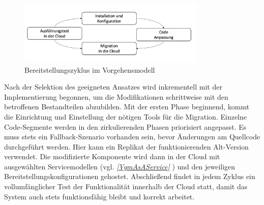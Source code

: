 
\begin{figure}[h] 
  \centering
  \includegraphics[width=0.8\textwidth]{Chapters/Vorgehensmodell/images/Bereitstellungszyklus.png}
  \caption{Bereitstellungszyklus im Vorgehensmodell \cite{ccRoadmap}}
  \label{fig:Bereitstellungszyklus}
\end{figure}
Nach der Selektion des geeigneten Ansatzes wird inkrementell mit der Implementierung begonnen, um die Modifikationen schrittweise mit den betroffenen Bestandteilen abzubilden. Mit der ersten Phase beginnend, kommt die Einrichtung und Einstellung der nötigen Tools für die Migration.  Einzelne Code-Segmente werden in den zirkulierenden Phasen priorisiert angepasst.
Es muss stets ein Fallback-Szenario vorhanden sein, bevor Änderungen am Quellcode durchgeführt werden. Hier kann ein Replikat der funktionierenden Alt-Version verwendet. 
Die modifizierte Komponente wird dann in der Cloud mit ausgewählten Servicemodellen (vgl. \textit{\ref{VgmAsAService} }) und den jeweiligen Bereitstellungskonfigurationen gehostet. Abschließend findet in jedem Zyklus ein vollumfänglicher Test der Funktionalität innerhalb der Cloud statt, damit das System auch stets funktionsfähig bleibt und korrekt arbeitet.
 

